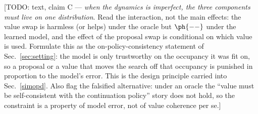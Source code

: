 [TODO: text, claim C --- \emph{when the dynamics is imperfect, the three
components must live on one distribution}. Read the interaction, not the main
effects: the value swap is harmless (or helps) under the oracle but
$\ph{--}$ under the learned model, and the effect of the proposal swap is
conditional on which value is used. Formulate this as the on-policy-consistency
statement of Sec.~\ref{sec:setting}: the model is only trustworthy on the
occupancy it was fit on, so a proposal or a value that moves the search off that
occupancy is punished in proportion to the model's error. This is the design
principle carried into Sec.~\ref{simopd}. Also flag the falsified alternative:
under an oracle the ``value must be self-consistent with the continuation
policy'' story does not hold, so the constraint is a property of model error,
not of value coherence per se.]

